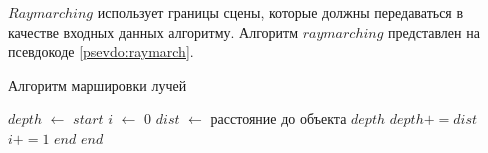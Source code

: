 $Raymarching$ использует границы сцены,
которые должны передаваться в качестве входных данных алгоритму.
Алгоритм $raymarching$ представлен на псевдокоде \ref{psevdo:raymarch}.
\begin{algorithm}
\caption{Алгоритм маршировки лучей}\label{psevdo:raymarch}
\begin{algorithmic}[1]
  \State $depth$ $\leftarrow$ $start$
  \State $i$ $\leftarrow$ $0$
    \State $dist$ $\leftarrow$ расстояние до объекта
      \State \Return $depth$
    \EndIf
    \State $depth += dist$
    \State $i += 1$
      \State \Return $end$
    \EndIf
  \EndWhile
  \State \Return $end$
  \EndFunction
\end{algorithmic}
\end{algorithm}
\clearpage

